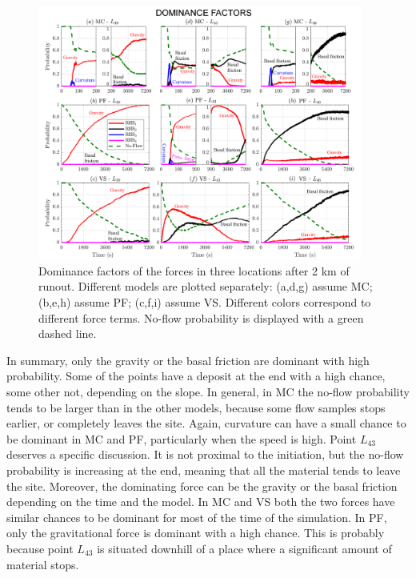 \documentclass{article}
\begin{document}
\begin{figure}[H]
         \centering
        \includegraphics[width=0.95\textwidth]{figures/Colima/Pr2_total.png}
        \caption{Dominance factors of the forces in three locations after 2 km of runout. Different models are plotted separately: (a,d,g) assume MC; (b,e,h) assume PF; (c,f,i) assume VS. Different colors correspond to different force terms. No-flow probability is displayed with a green dashed line.}
        \label{fig:Colima-Pr2}
\end{figure}
In summary, only the gravity or the basal friction are dominant with high probability. Some of the points have a deposit at the end with a high chance, some other not, depending on the slope. In general, in MC the no-flow probability tends to be larger than in the other models, because some flow samples stops earlier, or completely leaves the site. Again, curvature can have a small chance to be dominant in MC and PF, particularly when the speed is high. Point $L_{43}$ deserves a specific discussion. It is not proximal to the initiation, but the no-flow probability is increasing at the end, meaning that all the material tends to leave the site. Moreover, the dominating force can be the gravity or the basal friction depending on the time and the model. In MC and VS both the two forces have similar chances to be dominant for  most of the time of the simulation. In PF, only the gravitational force is dominant with a high chance. This is probably because point $L_{43}$ is situated downhill of a place where a significant amount of material stops.
\end{document}
